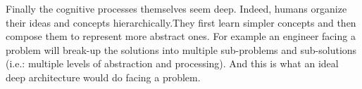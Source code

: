 \documentclass[a4paper,11pt]{report}
\begin{document}
			Finally the cognitive processes themselves seem deep. Indeed, humans organize their ideas and concepts hierarchically.They first learn simpler concepts and then compose them to represent more abstract ones. For example an engineer facing a problem will break-up the solutions into multiple sub-problems and sub-solutions (i.e.: multiple levels of abstraction and processing). And this is what an ideal deep architecture would do facing a problem.
    
    
%     
%       
\end{document}
